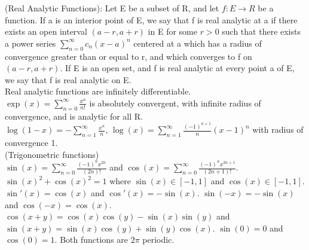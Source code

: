 \documentclass[10pt]{article}
\begin{document}
\begin{small}
(Real Analytic Functions): Let E be a subset of R, and let $f:E\rightarrow R$ be a function. 
If a is an interior point of E, we say that f is real analytic at a if there exists an open interval $(a - r, a + r)$ in E for some $r > 0$ such that there exists a power series $\displaystyle\sum_{n=0}^{\infty} c_n(x-a)^n$ centered at a which has a radius of convergence greater than or equal to r, and which converges to f on $(a-r,a+r)$.
If E is an open set, and f is real analytic at every point a of E, we say that f is real analytic on E.\\
Real analytic functions are infinitely differentiable.\\
$\displaystyle \exp(x)=\sum_{n=0}^{\infty}\frac{x^n}{n!}$ is absolutely convergent, with infinite radius of convergence, and is analytic for all R.\\
$\displaystyle \log(1-x)=-\sum_{n=1}^{\infty}\frac{x^n}{n}$, $\displaystyle \log(x)=\sum_{n=1}^{\infty}\frac{(-1)^{n+1}}{n}(x-1)^n$ with radius of convergence 1.\\ 
(Trigonometric functions)\\ 
$\displaystyle\sin(x)=\sum_{n=0}^{\infty}\frac{(-1)^nx^{2n}}{(2n)!}$ and $\displaystyle\cos(x)=\sum_{n=0}^{\infty}\frac{(-1)^nx^{2n+1}}{(2n+1)!}$.\\
$\sin(x)^2+\cos(x)^2=1$ where $\sin(x)\in[-1,1]$ and $\cos(x)\in[-1,1]$. $\sin'(x)=\cos(x)$ and $\cos'(x)=-\sin(x)$. $\sin(-x)=-\sin(x)$ and $\cos(-x)=\cos(x)$. $\cos(x+y)=\cos(x)\cos(y)-\sin(x)\sin(y)$ and $\sin(x+y)=\sin(x)\cos(y)+\sin(y)\cos(x)$. $\sin(0)=0$ and $\cos(0)=1$. Both functions are $2\pi$ periodic.


\end{small}
\end{document}
